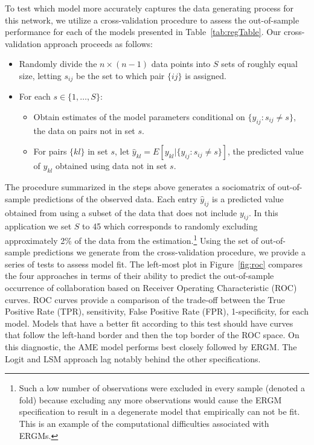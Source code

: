 \documentclass[12pt,pdflatex]{elsarticle}
\begin{document}
To test which model more accurately captures the data generating process for this network, we utilize a cross-validation procedure to assess the out-of-sample performance for each of the models presented in Table~\ref{tab:regTable}. Our cross-validation approach proceeds as follows:

\begin{itemize}
	\item Randomly divide the $n \times (n-1)$ data points into $S$ sets of roughly equal size, letting $s_{ij}$ be the set to which pair $\{ij\}$ is assigned.
	\item For each $s \in \{1, \ldots, S\}$:
	\begin{itemize}
		\item Obtain estimates of the model parameters conditional on $\{y_{ij} : s_{ij} \neq s\}$, the data on pairs not in set $s$.
		\item For pairs $\{kl\}$ in set $s$, let $\hat y_{kl} = E[y_{kl} | \{y_{ij} : s_{ij} \neq s\}]$, the predicted value of $y_{kl}$ obtained using data not in set $s$.
	\end{itemize}
\end{itemize}

The procedure summarized in the steps above generates a sociomatrix of out-of-sample predictions of the observed data. Each entry $\hat y_{ij}$ is a predicted value obtained from using a subset of the data that does not include $y_{ij}$. In this application we set $S$ to 45 which corresponds to randomly excluding approximately 2\% of the data from the estimation.\footnote{Such a low number of observations were excluded in every sample (denoted a fold) because excluding any more observations would cause the ERGM specification to result in a degenerate model that empirically can not be fit. This is an example of the computational difficulties associated with ERGMs.} Using the set of out-of-sample predictions we generate from the cross-validation procedure, we provide a series of tests to assess model fit. The left-most plot in Figure~\ref{fig:roc} compares the four approaches in terms of their ability to predict the out-of-sample occurrence of collaboration based on Receiver Operating Characteristic (ROC) curves. ROC curves provide a comparison of the trade-off between the True Positive Rate (TPR), sensitivity, False Positive Rate (FPR), 1-specificity, for each model. Models that have a better fit according to this test should have curves that follow the left-hand border and then the top border of the ROC space. On this diagnostic, the AME model performs best closely followed by ERGM. The Logit and LSM approach lag notably behind the other specifications. 
\end{document}
